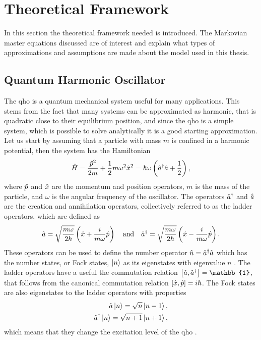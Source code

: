 \section{Theoretical Framework}
In this section the theoretical framework needed is introduced. The Markovian master equations discussed are of interest and explain what types of approximations and assumptions are made about the model used in this thesis. 
\subsection{Quantum Harmonic Oscillator} \label{sec:qho}
The \gls{qho} is a quantum mechanical system useful for many applications. This stems from the fact that many systems can be approximated as harmonic, that is quadratic close to their equilibrium position, and since the \gls{qho} is a simple system, which is possible to solve analytically it is a good starting approximation. Let us start by assuming that a particle with mass $m$ is confined in a harmonic potential, then the system has the Hamiltonian
\begin{equation}
    \hat{H} = \frac{\hat{p}^2}{2m} + \frac{1}{2}m\omega^2\hat{x}^2 = \hbar\omega\left(\hat{a}^{\dagger}\hat{a} + \frac{1}{2}\right), \label{eq:hamiltonian}
\end{equation}
where $\hat{p}$ and $\hat{x}$ are the momentum and position operators, $m$ is the mass of the particle, and $\omega$ is the angular frequency of the oscillator. The operators $\hat{a}^{\dagger}$ and $\hat{a}$ are the creation and annihilation operators, collectively referred to as the ladder operators, which are defined as
\begin{equation}
    \hat{a} = \sqrt{\frac{m\omega}{2\hbar}} \left(\hat{x} + \frac{i}{m\omega} \hat{p}\right) \quad \text{and} \quad \hat{a}^{\dagger} = \sqrt{\frac{m\omega}{2\hbar}} \left(\hat{x} - \frac{i}{m\omega} \hat{p}\right).
\end{equation}
These operators can be used to define the number operator $\hat{n} = \hat{a}^{\dagger}\hat{a}$ which has the number states, or Fock states, $\ket{n}$ as its eigenstates with eigenvalue $n$ \cite{Meystre:2021}. The ladder operators have a useful the commutation relation $\comm{\a}{\ad} = \mathbb{1}$, that follows from the canonical commutation relation $\comm{\xop}{\pop} = i\hbar$. The Fock states are also eigenstates to the ladder operators with properties
\begin{align}
    \hat{a} \ket{n} = \sqrt{n} \ket{n-1},\\
    \hat{a}^{\dagger} \ket{n} = \sqrt{n+1} \ket{n+1},
\end{align}
which means that they change the excitation level of the \gls{qho} \cite{Meystre:2021}.

